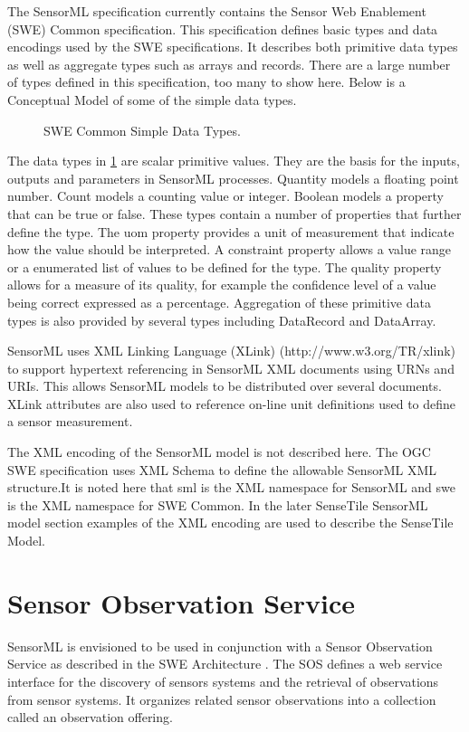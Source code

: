 \documentclass[]{final_report}
\begin{document}
The SensorML specification currently contains the Sensor Web Enablement (SWE) Common specification. This specification defines basic types and data encodings used by the SWE specifications. It describes both primitive data types as well as aggregate types such as arrays and records. There are a large number of types defined in this specification, too many to show here. Below is a Conceptual Model of some of the simple data types.

\begin{figure}[h]
\caption{SWE Common Simple Data Types.}\label{fig:SWESimpleConceptualModel}
\end{figure}

The data types in \ref{fig:SWESimpleConceptualModel} are scalar primitive values. They are the basis for the inputs, outputs and parameters in SensorML processes. Quantity models a floating point number. Count models a counting value or integer.  Boolean models a property that can be true or false. These types contain a number of properties that further define the type. The uom property provides a unit of measurement that indicate how the value should be interpreted.  A constraint property allows a value range or a enumerated list of values to be defined for the type. The quality property allows for a measure of its quality, for example the confidence level of a value being correct expressed as a percentage. Aggregation of these primitive data types is also provided by several types including DataRecord and DataArray.

SensorML uses XML Linking Language (XLink) (http://www.w3.org/TR/xlink) to support hypertext referencing in SensorML XML documents using URNs and URIs. This allows SensorML models to be distributed over several documents. XLink attributes are also used to reference on-line unit definitions used to define a sensor measurement.

The XML encoding of the SensorML model is not described here. The OGC SWE specification uses XML Schema to define the allowable SensorML XML structure.It is noted here that sml is the XML namespace for SensorML and swe is the XML namespace for SWE Common. In the later SenseTile SensorML model section examples of the XML encoding are used to describe the SenseTile Model. 

\section{Sensor Observation Service}
SensorML is envisioned to be used in conjunction with a Sensor Observation Service as described in the SWE Architecture \cite{SOSref}. The SOS defines a web service interface for the discovery of sensors systems and the retrieval of observations from sensor systems. It organizes related sensor observations into a collection called an observation offering.   
\end{document}
